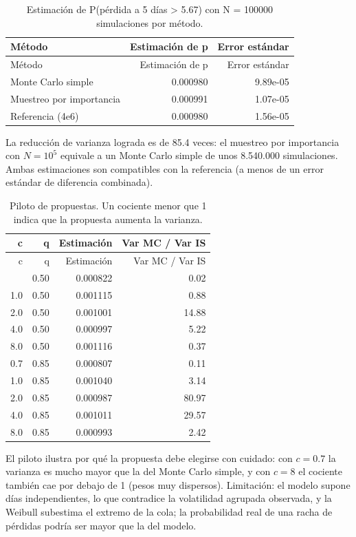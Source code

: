 \documentclass[
  spanish,
]{article}
\begin{document}
\begin{longtable}[]{@{}lrr@{}}
\caption{Estimación de P(pérdida a 5 días \textgreater{} 5.67) con N =
100000 simulaciones por método.}\tabularnewline
\toprule\noalign{}
Método & Estimación de p & Error estándar \\
\midrule\noalign{}
\endfirsthead
\toprule\noalign{}
Método & Estimación de p & Error estándar \\
\midrule\noalign{}
\endhead
\bottomrule\noalign{}
\endlastfoot
Monte Carlo simple & 0.000980 & 9.89e-05 \\
Muestreo por importancia & 0.000991 & 1.07e-05 \\
Referencia (4e6) & 0.000980 & 1.56e-05 \\
\end{longtable}

La reducción de varianza lograda es de 85.4 veces: el muestreo por
importancia con \(N=\ensuremath{10^{5}}\) equivale a un Monte Carlo
simple de unos 8.540.000 simulaciones. Ambas estimaciones son
compatibles con la referencia (a menos de un error estándar de
diferencia combinada).

\begin{longtable}[]{@{}rrrr@{}}
\caption{Piloto de propuestas. Un cociente menor que 1 indica que la
propuesta aumenta la varianza.}\tabularnewline
\toprule\noalign{}
c & q & Estimación & Var MC / Var IS \\
\midrule\noalign{}
\endfirsthead
\toprule\noalign{}
c & q & Estimación & Var MC / Var IS \\
\midrule\noalign{}
\endhead
\bottomrule\noalign{}
\endlastfoot
0.7 & 0.50 & 0.000822 & 0.02 \\
1.0 & 0.50 & 0.001115 & 0.88 \\
2.0 & 0.50 & 0.001001 & 14.88 \\
4.0 & 0.50 & 0.000997 & 5.22 \\
8.0 & 0.50 & 0.001116 & 0.37 \\
0.7 & 0.85 & 0.000807 & 0.11 \\
1.0 & 0.85 & 0.001040 & 3.14 \\
2.0 & 0.85 & 0.000987 & 80.97 \\
4.0 & 0.85 & 0.001011 & 29.57 \\
8.0 & 0.85 & 0.000993 & 2.42 \\
\end{longtable}

El piloto ilustra por qué la propuesta debe elegirse con cuidado: con
\(c=0.7\) la varianza es mucho mayor que la del Monte Carlo simple, y
con \(c=8\) el cociente también cae por debajo de 1 (pesos muy
dispersos). Limitación: el modelo supone días independientes, lo que
contradice la volatilidad agrupada observada, y la Weibull subestima el
extremo de la cola; la probabilidad real de una racha de pérdidas podría
ser mayor que la del modelo.
\end{document}
